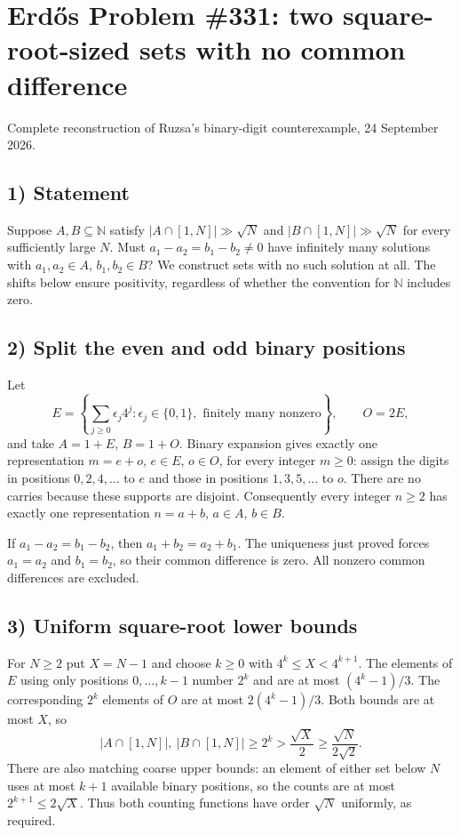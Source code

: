 \section{Erd\H{o}s Problem \#331: two square-root-sized sets with no common difference}
\noindent Complete reconstruction of Ruzsa's binary-digit counterexample, 24 September 2026.

\subsection*{1) Statement}
Suppose $A,B\subseteq\mathbb N$ satisfy $|A\cap[1,N]|\gg\sqrt N$ and $|B\cap[1,N]|\gg\sqrt N$ for every sufficiently large $N$. Must $a_1-a_2=b_1-b_2\ne0$ have infinitely many solutions with $a_1,a_2\in A$, $b_1,b_2\in B$? We construct sets with no such solution at all. The shifts below ensure positivity, regardless of whether the convention for $\mathbb N$ includes zero.

\subsection*{2) Split the even and odd binary positions}
Let
\[E=\left\{\sum_{j\ge0}\epsilon_j4^j:\epsilon_j\in\{0,1\},\text{ finitely many nonzero}\right\},\qquad O=2E,
\]
and take $A=1+E$, $B=1+O$. Binary expansion gives exactly one representation $m=e+o$, $e\in E$, $o\in O$, for every integer $m\ge0$: assign the digits in positions $0,2,4,\ldots$ to $e$ and those in positions $1,3,5,\ldots$ to $o$. There are no carries because these supports are disjoint. Consequently every integer $n\ge2$ has exactly one representation $n=a+b$, $a\in A$, $b\in B$.

If $a_1-a_2=b_1-b_2$, then $a_1+b_2=a_2+b_1$. The uniqueness just proved forces $a_1=a_2$ and $b_1=b_2$, so their common difference is zero. All nonzero common differences are excluded.

\subsection*{3) Uniform square-root lower bounds}
For $N\ge2$ put $X=N-1$ and choose $k\ge0$ with $4^k\le X<4^{k+1}$. The elements of $E$ using only positions $0,\ldots,k-1$ number $2^k$ and are at most $(4^k-1)/3$. The corresponding $2^k$ elements of $O$ are at most $2(4^k-1)/3$. Both bounds are at most $X$, so
\[|A\cap[1,N]|,\ |B\cap[1,N]|\ge2^k>\frac{\sqrt X}{2}\ge\frac{\sqrt N}{2\sqrt2}.
\]
There are also matching coarse upper bounds: an element of either set below $N$ uses at most $k+1$ available binary positions, so the counts are at most $2^{k+1}\le2\sqrt X$. Thus both counting functions have order $\sqrt N$ uniformly, as required.


